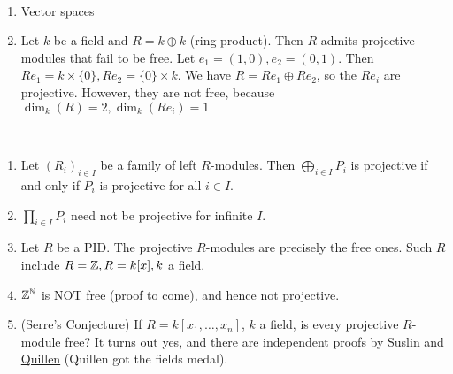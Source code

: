 \documentclass[x11names,reqno,14pt]{extarticle}
\begin{document}
\exm\,

\begin{enumerate}

\item Vector spaces

\item Let $k$ be a field and $R = k\oplus k$ (ring product). Then $R$ admits projective modules that fail to be free. Let $e_1 = (1, 0), e_2 = (0, 1)$. Then $Re_1 = k\times\{0\}, Re_2 = \{0\}\times k$. We have $R  = Re_1\oplus Re_2$, so the $Re_i$ are projective. However, they are not free, because $\dim_k(R) = 2, \dim_k(Re_i) = 1$

\end{enumerate}

\rem\,

\begin{enumerate}

\item Let $(R_i)_{i\in I}$ be a family of left $R$-modules. Then $\bigoplus_{i\in I}P_i$ is projective if and only if $P_i$ is projective for all $i\in I$. 
\dbend

\item $\prod_{i\in I}P_i$ need not be projective for infinite $I$.

\item Let $R$ be a PID. The projective $R$-modules are precisely the free ones. Such $R$ include $R = \mathbb{Z}, R = k[x], k$ a field.  

\item $\mathbb{Z}^{\mathbb{N}}$ is \underline{NOT} free (proof to come), and hence not projective. 

\item (Serre's Conjecture) If $R = k[x_1, \dots, x_n]$, $k$ a field, is every projective $R$-module free? It turns out yes, and there are independent proofs by Suslin and \underline{Quillen} (Quillen got the fields medal).

\end{enumerate}
\end{document}
